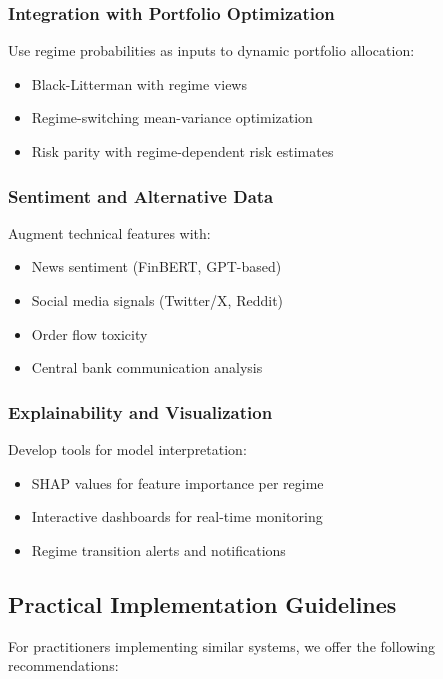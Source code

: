\documentclass[conference]{IEEEtran}
\begin{document}
\subsubsection{Integration with Portfolio Optimization}
Use regime probabilities as inputs to dynamic portfolio allocation:
\begin{itemize}
\item Black-Litterman with regime views
\item Regime-switching mean-variance optimization
\item Risk parity with regime-dependent risk estimates
\end{itemize}

\subsubsection{Sentiment and Alternative Data}
Augment technical features with:
\begin{itemize}
\item News sentiment (FinBERT, GPT-based)
\item Social media signals (Twitter/X, Reddit)
\item Order flow toxicity
\item Central bank communication analysis
\end{itemize}

\subsubsection{Explainability and Visualization}
Develop tools for model interpretation:
\begin{itemize}
\item SHAP values for feature importance per regime
\item Interactive dashboards for real-time monitoring
\item Regime transition alerts and notifications
\end{itemize}

\subsection{Practical Implementation Guidelines}

For practitioners implementing similar systems, we offer the following recommendations:
\end{document}
